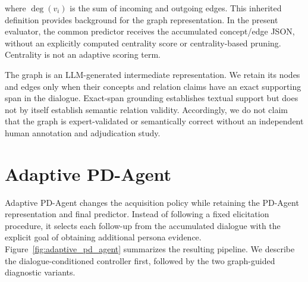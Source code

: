 \documentclass{ieeeaccess}
\begin{document}
where $\deg(v_i)$ is the sum of incoming and outgoing edges. This inherited definition
provides background for the graph representation. In the present evaluator, the common
predictor receives the accumulated concept/edge JSON, without an explicitly computed
centrality score or centrality-based pruning. Centrality is not an adaptive scoring term.

The graph is an LLM-generated intermediate representation. We retain its nodes and edges
only when their concepts and relation claims have an exact supporting span in the dialogue.
Exact-span grounding establishes textual support but does not by itself establish semantic
relation validity. Accordingly, we do not claim that the graph is expert-validated or
semantically correct without an independent human annotation and adjudication study.

\section{Adaptive PD-Agent}

Adaptive PD-Agent changes the acquisition policy while retaining the PD-Agent representation
and final predictor. Instead of following a fixed elicitation procedure, it selects each
follow-up from the accumulated dialogue with the explicit goal of obtaining additional
persona evidence. Figure~\ref{fig:adaptive_pd_agent} summarizes the resulting pipeline.
We describe the dialogue-conditioned controller first, followed by the two graph-guided
diagnostic variants.
\end{document}
